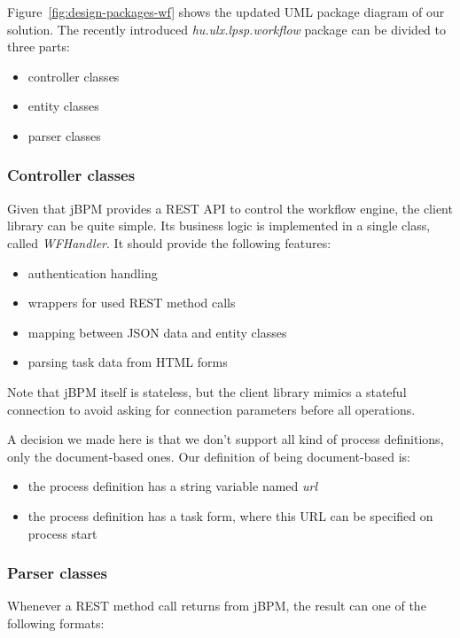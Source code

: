 Figure~\ref{fig:design-packages-wf} shows the updated UML package diagram of our
solution. The recently introduced \emph{hu.ulx.lpsp.workflow} package can be divided to three
parts:

\begin{itemize}
\item controller classes
\item entity classes
\item parser classes
\end{itemize}

\subsubsection*{Controller classes}

Given that jBPM provides a REST API to control the workflow engine, the client
library can be quite simple. Its business logic is implemented in a single
class, called \emph{WFHandler}. It should provide the following features:

\begin{itemize}
\item authentication handling
\item wrappers for used REST method calls
\item mapping between JSON data and entity classes
\item parsing task data from HTML forms
\end{itemize}

Note that jBPM itself is stateless, but the client library mimics a stateful
connection to avoid asking for connection parameters before all operations.

A decision we made here is that we don't support all kind of process
definitions, only the document-based ones. Our definition of being
document-based is:

\begin{itemize}
\item the process definition has a string variable named \emph{url}
\item the process definition has a task form, where this URL can be specified on process start
\end{itemize}

\subsubsection*{Parser classes}

Whenever a REST method call returns from jBPM, the result can one of the following formats:

